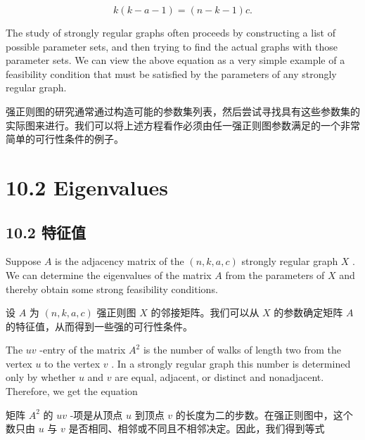 \documentclass[10pt]{article}
\begin{document}
\[
k\left( {k - a - 1}\right)  = \left( {n - k - 1}\right) c. \tag{10.1}
\]

The study of strongly regular graphs often proceeds by constructing a list of possible parameter sets, and then trying to find the actual graphs with those parameter sets. We can view the above equation as a very simple example of a feasibility condition that must be satisfied by the parameters of any strongly regular graph.

\begin{tcolorbox}\relax
强正则图的研究通常通过构造可能的参数集列表，然后尝试寻找具有这些参数集的实际图来进行。我们可以将上述方程看作必须由任一强正则图参数满足的一个非常简单的可行性条件的例子。
\end{tcolorbox}

\section*{10.2 Eigenvalues}

\begin{tcolorbox}\relax
\section*{10.2 特征值}
\end{tcolorbox}

Suppose \(A\) is the adjacency matrix of the \(\left( {n,k,a,c}\right)\) strongly regular graph \(X\) . We can determine the eigenvalues of the matrix \(A\) from the parameters of \(X\) and thereby obtain some strong feasibility conditions.

\begin{tcolorbox}\relax
设 \(A\) 为 \(\left( {n,k,a,c}\right)\) 强正则图 \(X\) 的邻接矩阵。我们可以从 \(X\) 的参数确定矩阵 \(A\) 的特征值，从而得到一些强的可行性条件。
\end{tcolorbox}

The \({uv}\) -entry of the matrix \({A}^{2}\) is the number of walks of length two from the vertex \(u\) to the vertex \(v\) . In a strongly regular graph this number is determined only by whether \(u\) and \(v\) are equal, adjacent, or distinct and nonadjacent. Therefore, we get the equation

\begin{tcolorbox}\relax
矩阵 \({A}^{2}\) 的 \({uv}\) -项是从顶点 \(u\) 到顶点 \(v\) 的长度为二的步数。在强正则图中，这个数只由 \(u\) 与 \(v\) 是否相同、相邻或不同且不相邻决定。因此，我们得到等式
\end{tcolorbox}
\end{document}
